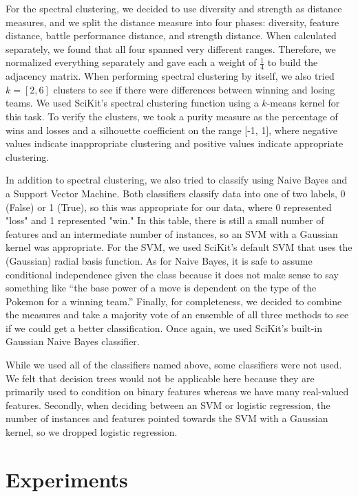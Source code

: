 \documentclass{acm_proc_article-sp}
\begin{document}
For the spectral clustering, we decided to use diversity and strength as distance measures, and we split the distance measure into four phases: diversity, feature distance, battle performance distance, and strength distance. When calculated separately, we found that all four spanned very different ranges. Therefore, we normalized everything separately and gave each a weight of $\frac{1}{4}$ to build the adjacency matrix. When performing spectral clustering by itself, we also tried $k=[2, 6]$ clusters to see if there were differences between winning and losing teams. We used SciKit's spectral clustering function using a $k$-means kernel for this task. To verify the clusters, we took a purity measure as the percentage of wins and losses and a silhouette coefficient on the range [-1, 1], where negative values indicate inappropriate clustering and positive values indicate appropriate clustering.

In addition to spectral clustering, we also tried to classify using Naive Bayes and a Support Vector Machine. Both classifiers classify data into one of two labels, 0 (False) or 1 (True), so this was appropriate for our data, where 0 represented "loss" and 1 represented "win." In this table, there is still a small number of features and an intermediate number of instances, so an SVM with a Gaussian kernel was appropriate. For the SVM, we used SciKit's default SVM that uses the (Gaussian) radial basis function. As for Naive Bayes, it is safe to assume conditional independence given the class because it does not make sense to say something like “the base power of a move is dependent on the type of the Pokemon for a winning team.” Finally, for completeness, we decided to combine the measures and take a majority vote of an ensemble of all three methods to see if we could get a better classification. Once again, we used SciKit's built-in Gaussian Naive Bayes classifier.

While we used all of the classifiers named above, some classifiers were not used. We felt that decision trees would not be applicable here because they are primarily used to condition on binary features whereas we have many real-valued features. Secondly, when deciding between an SVM or logistic regression, the number of instances and features pointed towards the SVM with a Gaussian kernel, so we dropped logistic regression.

\section{Experiments}
\end{document}
